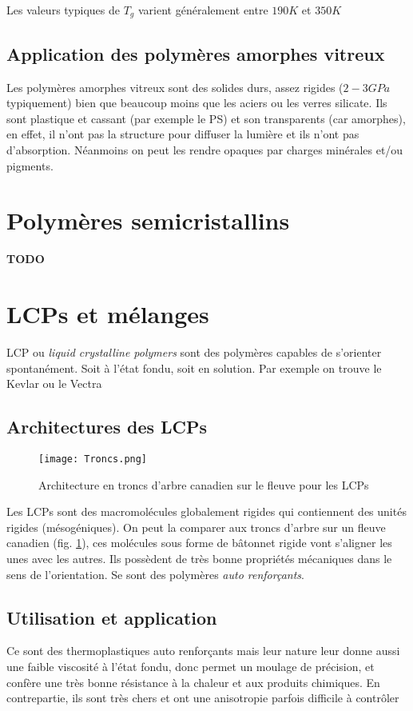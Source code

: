 \documentclass[../main.tex]{subfiles}
\begin{document}
	Les valeurs typiques de $T_g$ varient généralement entre $190K$ et $350K$
	\subsection{Application des polymères amorphes vitreux}
	Les polymères amorphes vitreux sont des solides durs, assez rigides ($2-3GPa$ typiquement) bien que beaucoup moins que les aciers ou les verres silicate. Ils sont plastique et cassant (par exemple le PS) et son transparents (car amorphes), en effet, il n'ont pas la structure pour diffuser la lumière et ils n'ont pas d'absorption. Néanmoins on peut les rendre opaques par charges minérales et/ou pigments.
	\section{Polymères semicristallins}
	\textbf{TODO}
	\section{LCPs et mélanges}
	LCP ou \textit{liquid crystalline polymers} sont des polymères capables de s'orienter spontanément. Soit à l'état fondu, soit en solution. Par exemple on trouve le Kevlar ou le Vectra
	\subsection{Architectures des LCPs}
	\begin{figure}
		\begin{center}
			\texttt{[image: Troncs.png]}
			\caption{\label{LCP} Architecture en troncs d'arbre canadien sur le fleuve pour les LCPs}
		\end{center}
	
	\end{figure}
	Les LCPs sont des macromolécules globalement rigides qui contiennent des unités rigides (mésogéniques). On peut la comparer aux troncs d'arbre sur un fleuve canadien (fig. \ref{LCP}), ces molécules sous forme de bâtonnet rigide vont s'aligner les unes avec les autres. Ils possèdent de très bonne propriétés mécaniques dans le sens de l'orientation. Se sont des polymères \textit{auto renforçants}.
	\subsection{Utilisation et application}
	Ce sont des thermoplastiques auto renforçants mais leur nature leur donne aussi une faible viscosité à l'état fondu, donc permet un moulage de précision, et confère une très bonne résistance à la chaleur et aux produits chimiques. En contrepartie, ils sont très chers et ont une anisotropie parfois difficile à contrôler
\end{document}
